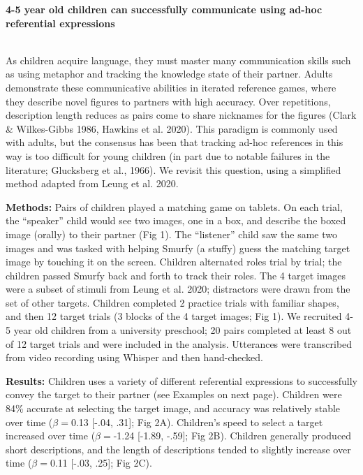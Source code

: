 \documentclass[11pt,a4paper]{article}
\renewcommand{\title}[1]{\textbf{#1}\\}
\newcommand{\authors}[1]{\iftoggle{anonymous}{\phantom{#1}}{#1}\\}
\newcommand{\email}[1]{\iftoggle{anonymous}{\phantom{#1}}{#1}}
\begin{document}

\noindent\title{4-5 year old children can successfully communicate using ad-hoc referential expressions}
\authors{Veronica Boyce, Ilaria Chen, Bobby Sparks, Malia Perez, Michael C. Frank} 
\email{vboyce@stanford.edu;  Stanford University}
\newline
%




As children acquire language, they must master many communication skills such as using metaphor and tracking the knowledge state of their partner. Adults demonstrate these communicative abilities in iterated reference games, where they describe novel figures to partners with high accuracy. Over repetitions, description length reduces as pairs come to share nicknames for the figures (Clark \& Wilkes-Gibbs 1986, Hawkins et al. 2020). This paradigm is commonly used with adults, but the consensus has been that tracking ad-hoc references in this way is too difficult for young children (in part due to notable failures in the literature; Glucksberg et al., 1966). We revisit this question, using a simplified method adapted from Leung et al. 2020.

\bigskip
\textbf{Methods:} Pairs of children played a matching game on tablets. On each trial, the ``speaker'' child would see two images, one in a box, and describe the boxed image (orally) to their partner (Fig 1). The ``listener'' child saw the same two images and was tasked with helping Smurfy (a stuffy) guess the matching target image by touching it on the screen. Children alternated roles trial by trial; the children passed Smurfy back and forth to track their roles. The 4 target images were a subset of stimuli from Leung et al. 2020; distractors were drawn from the set of other targets. Children completed 2 practice trials with familiar shapes, and then 12 target trials (3 blocks of the 4 target images; Fig 1). We recruited 4-5 year old children from a university preschool; 20 pairs completed at least 8 out of 12 target trials and were included in the analysis. Utterances were transcribed from video recording using Whisper and then hand-checked. 

\bigskip

\textbf{Results:} 
Children uses a variety of different referential expressions to successfully convey the target to their partner (see Examples on next page). Children were 84\% accurate at selecting the target image, and accuracy was relatively stable over time ($\beta=$0.13 [-.04, .31]; Fig 2A). Children's speed to select a target increased over time ($\beta=$-1.24 [-1.89, -.59]; Fig 2B). Children generally produced short descriptions, and the length of descriptions tended to slightly increase over time ($\beta=$0.11 [-.03, .25]; Fig 2C). 
\end{document}
